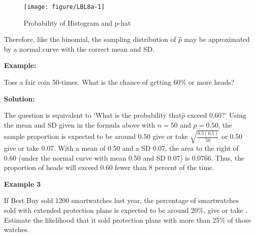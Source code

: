 \documentclass[11pt, chapterprefix=true]{scrbook}\usepackage[]{graphicx}\usepackage[]{color}
\begin{document}
\begin{figure}[ht]

\caption{Probability of Histogram and p-hat}



{\centering \texttt{[image: figure/LBL8a-1]} 

}



\end{figure}

Therefore, like the binomial, the sampling distribution of $\hat{p}$ may be approximated by a normal curve with the correct mean and SD.

\begin{minipage}[ht]{3cm}


\textbf{Example:}
\end{minipage}
\begin{minipage}[ht]{11cm}

\parbox{11cm}{Toss a fair coin 50-times.  What is the chance of getting 60\% or more heads?
}
\end{minipage}

\begin{minipage}[ht]{3cm}

\vspace{-28mm}

\textbf{Solution:}
\end{minipage}
\begin{minipage}[ht]{11cm}

\parbox{11cm}{
The question is equivalent to `What is the probability that$\hat{p}$ exceed 0.60?'  Using the mean and SD given in the formula above with $n = 50$ and $p = 0.50$, the sample proportion is expected to be around 0.50 give or take $\sqrt{\frac{0.5 (0.5)}{50}}$ or 0.50 give or take 0.07.  With a mean of 0.50 and a SD 0.07, the area to the right of 0.60 (under the normal curve with mean 0.50 and SD 0.07) is 0.0766.  Thus, the proportion of heads will exceed 0.60 fewer than 8 percent of the time.

}
\end{minipage}

\begin{minipage}[ht]{3cm}

\vspace{-14mm}

\textbf{Example 3}
\end{minipage}
\begin{minipage}[ht]{11cm}

\parbox{11cm}{
If Best Buy sold 1200 smartwatches last year, the percentage of smartwatches sold with extended protection plans is expected to be around 20\%, give or take \underline{\phantom{xxxxxx}}.  Estimate the likelihood that it sold protection plans with more than 25\% of those watches.
}
\end{minipage}
\end{document}
